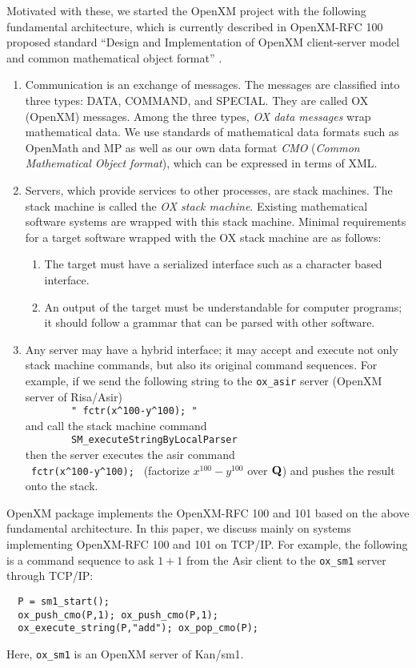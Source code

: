 Motivated with these, we started the OpenXM project with the following
fundamental architecture, which is currently described in
OpenXM-RFC 100  proposed standard %
``Design and Implementation of OpenXM client-server model and common
mathematical object format'' \cite{ox-rfc-100}.
\begin{enumerate}
\item Communication is an exchange of messages. The messages are classified into
three types:
DATA, COMMAND, and SPECIAL.
They are called OX (OpenXM) messages.
Among the three types,
{\it OX data messages} wrap mathematical data.
We use standards of mathematical data formats such as OpenMath and MP
as well as our own data format {\it CMO}
({\it Common Mathematical Object format}),
which can be expressed in terms of XML.
\item Servers, which provide services to other processes, are stack machines.
The stack machine is called the
{\it OX stack machine}.
Existing mathematical software systems are wrapped with this stack machine.
Minimal requirements for a target software wrapped with the OX stack machine
are as follows:
\begin{enumerate}
\item The target must have a serialized interface such as a character based
interface.
\item An output of the target must be understandable for computer programs;
it should follow a grammar that can be parsed with other software.
\end{enumerate}
\item Any server may have a hybrid interface;
it may accept and execute not only stack machine commands, 
but also its original command sequences.
For example,
if we send the following string to the {\tt ox\_asir} server 
(OpenXM server of Risa/Asir) \\
\verb+        " fctr(x^100-y^100); "      + \\
and call the stack machine command  \\
\verb+        SM_executeStringByLocalParser    + \\ 
then the server executes the asir command \\
\verb+ fctr(x^100-y^100); + 
(factorize $x^{100}-y^{100}$ over ${\bf Q}$)
and pushes the result onto the stack.
\end{enumerate}
OpenXM package  implements the OpenXM-RFC 100 \cite{ox-rfc-100}
and 101 \cite{ox-rfc-101} based on
the above fundamental architecture.
In this paper, we discuss mainly on systems implementing
OpenXM-RFC 100 and 101 on TCP/IP.
For example, the following is a command sequence to ask $1+1$ from
the Asir client to the {\tt ox\_sm1} server through TCP/IP:
\begin{verbatim}
  P = sm1_start();
  ox_push_cmo(P,1); ox_push_cmo(P,1);
  ox_execute_string(P,"add"); ox_pop_cmo(P);
\end{verbatim}
Here, {\tt ox\_sm1} is an OpenXM server of Kan/sm1.

